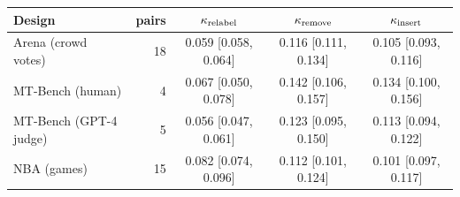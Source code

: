 \begin{tabular}{lrccc}\toprule
Design & pairs & $\kappa_{\rm relabel}$ & $\kappa_{\rm remove}$ & $\kappa_{\rm insert}$ \\\midrule
Arena (crowd votes) & 18 & 0.059 [0.058, 0.064] & 0.116 [0.111, 0.134] & 0.105 [0.093, 0.116] \\
MT-Bench (human) & 4 & 0.067 [0.050, 0.078] & 0.142 [0.106, 0.157] & 0.134 [0.100, 0.156] \\
MT-Bench (GPT-4 judge) & 5 & 0.056 [0.047, 0.061] & 0.123 [0.095, 0.150] & 0.113 [0.094, 0.122] \\
NBA (games) & 15 & 0.082 [0.074, 0.096] & 0.112 [0.101, 0.124] & 0.101 [0.097, 0.117] \\
\bottomrule\end{tabular}
